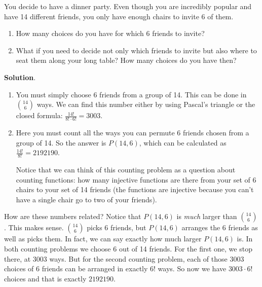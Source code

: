 \documentclass[11pt,]{book}
\theoremstyle{ptxplainnotitle}
\theoremstyle{ptxplaintitle}
\theoremstyle{ptxdefinitionnotitle}
\theoremstyle{ptxdefinitiontitle}
\theoremstyle{ptxdefinitionnotitle}
\theoremstyle{ptxdefinitiontitle}
\theoremstyle{ptxdefinitionnotitle}
\theoremstyle{ptxdefinitiontitle}
\theoremstyle{ptxdefinitiontitlenonumber}
\theoremstyle{ptxdefinitiontitlenonumber}
\numberwithin{equation}{chapter}
\begin{document}
\begin{example}\label{example-46}
\hypertarget{p-1443}{}%
You decide to have a dinner party. Even though you are incredibly popular and have 14 different friends, you only have enough chairs to invite 6 of them.%
\par
\hypertarget{p-1444}{}%
\leavevmode%
\begin{enumerate}
\item\hypertarget{li-623}{}\hypertarget{p-1445}{}%
How many choices do you have for which 6 friends to invite?%
\item\hypertarget{li-624}{}\hypertarget{p-1446}{}%
What if you need to decide not only which friends to invite but also where to seat them along your long table?  How many choices do you have then?%
\end{enumerate}
%
\par\smallskip%
\noindent\textbf{Solution}.\hypertarget{solution-173}{}\quad%
\hypertarget{p-1447}{}%
\leavevmode%
\begin{enumerate}
\item\hypertarget{li-625}{}\hypertarget{p-1448}{}%
You must simply choose 6 friends from a group of 14.  This can be done in \({14 \choose 6}\) ways.  We can find this number either by using Pascal's triangle or the closed formula: \(\frac{14!}{8!\cdot 6!} = 3003\).%
\item\hypertarget{li-626}{}\hypertarget{p-1449}{}%
Here you must count all the ways you can permute 6 friends chosen from a group of 14.  So the answer is \(P(14, 6)\), which can be calculated as \(\frac{14!}{8!} = 2192190\).%
\par
\hypertarget{p-1450}{}%
Notice that we can think of this counting problem as a question about counting functions: how many injective functions are there from your set of 6 chairs to your set of 14 friends (the functions are injective because you can't have a single chair go to two of your friends).%
\end{enumerate}
%
\par
\hypertarget{p-1451}{}%
How are these numbers related? Notice that \(P(14,6)\) is \emph{much} larger than \({14 \choose 6}\). This makes sense. \({14 \choose 6}\) picks 6 friends, but \(P(14,6)\) arranges the 6 friends as well as picks them. In fact, we can say exactly how much larger \(P(14,6)\) is. In both counting problems we choose 6 out of 14 friends. For the first one, we stop there, at 3003 ways. But for the second counting problem, each of those 3003 choices of 6 friends can be arranged in exactly \(6!\) ways. So now we have \(3003\cdot 6!\) choices and that is exactly \(2192190\).%

\end{example}
\end{document}
